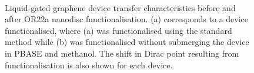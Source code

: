 \documentclass[
  a4paper,
]{scrbook}
\begin{document}
\begin{figure}
\begin{minipage}[t]{0.45\linewidth}
{{}

}

\end{minipage}%
%
\begin{minipage}[t]{0.01\linewidth}

{\centering 

~

}

\end{minipage}%

\caption{\label{fig-graphene-sensing-TX}Liquid-gated graphene device
transfer characteristics before and after OR22a nanodisc
functionalisation. (a) corresponds to a device functionalised, where (a)
was functionalised using the standard method while (b) was
functionalised without submerging the device in PBASE and methanol. The
shift in Dirac point resulting from functionalisation is also shown for
each device.}

\end{figure}
\end{document}
